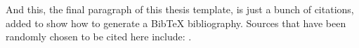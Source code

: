 \documentclass[ %
                    author={Natchalin Iwsakul \\ Inkaphol Siriwongwattana \\ Tanaphan Kummaraphat \\ Patorn Srisupap},
                supervisor={Fernando Moreno-Pino},
                    degree={MSc},
                     title={Propensity Modelling for SME Commercial Lending Using Open Public Data},
                  subtitle={Companies House filings and GDELT media coverage as predictors of first-time borrowing},
                      type={},
                      year={2026}]{dissertation}
\begin{document}
And this, the final paragraph of this thesis template, is just a bunch of citations, added to show how to generate a BibTeX bibliography. Sources that have been randomly chosen to be cited here include:
\cite{miller_etal_2018_clojure,webber_marwan_2015,touretzky_2013_lisp,eckmann_etal_1987,marwan_2011,vach_2015,shiller_2017,vytelingum_2006,tesfatsion_2002,rust_etal_1992}.





%
%

\backmatter





\appendix





\end{document}
